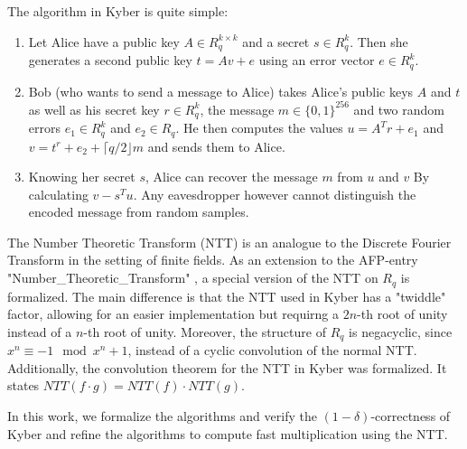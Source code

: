 \documentclass[11pt,a4paper]{article}
\begin{document}
The algorithm in Kyber is quite simple:
\begin{enumerate}
\item Let Alice have a public key $A \in R_q^{k\times k}$ and a secret $s\in R_q^k$. Then she generates a second public key $t = Av + e$ using an error vector $e\in R_q^k$.
\item Bob (who wants to send a message to Alice) takes Alice's public keys $A$ and $t$ as well as his secret key $r\in R_q^k$, the message $m\in\{0,1\}^{256}$ and two random errors $e_1\in R_q^k$ and $e_2\in R_q$. He then computes the values 
$u = A^Tr + e_1$ and $v = t^r + e_2 + \lceil q/2\rfloor m$ and sends them to Alice.
\item Knowing her secret $s$, Alice can recover the message $m$ from $u$ and $v$ By calculating $v-s^Tu$. Any eavesdropper however cannot distinguish the encoded message from random samples.
\end{enumerate}

The Number Theoretic Transform (NTT) is an analogue to the Discrete Fourier Transform in the setting of finite fields. 
As an extension to the AFP-entry "Number\_Theoretic\_Transform" \cite{NTT}, a special version of the NTT on $R_q$ is formalized. 
The main difference is that the NTT used in Kyber has a "twiddle" factor, allowing for an easier implementation but requirng a $2n$-th root of unity instead of a $n$-th root of unity. 
Moreover, the structure of $R_q$ is negacyclic, since $x^n\equiv -1\mod x^n+1$, instead of a cyclic convolution of the normal NTT. 
Additionally, the convolution theorem for the NTT in Kyber was formalized. It states $NTT (f\cdot g)  = NTT(f) \cdot NTT(g)$. 

In this work, we formalize the algorithms and verify the $(1-\delta)$-correctness of Kyber and refine the algorithms to compute fast multiplication using the NTT.

\vspace{1cm}





\end{document}
